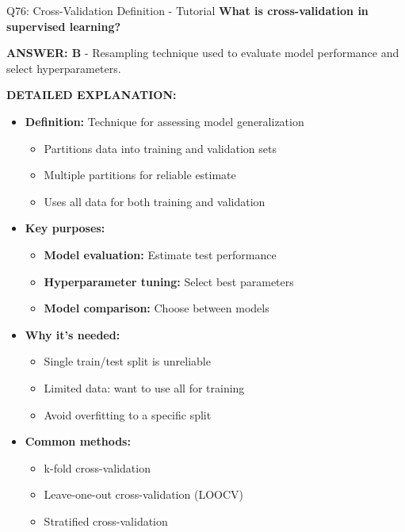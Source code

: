 \documentclass[8pt]{beamer}
\begin{document}
	
	\begin{frame}{Q76: Cross-Validation Definition - Tutorial}
		\fontsize{6.5}{7.5}\selectfont
		\textbf{What is cross-validation in supervised learning?}
		
		\vspace{0.05cm}
		\textcolor{myblue}{\textbf{ANSWER: B}} - Resampling technique used to evaluate model performance and select hyperparameters.
		
		\vspace{0.05cm}
		\textbf{DETAILED EXPLANATION:}
		\begin{itemize}
			\item \textbf{Definition:} Technique for assessing model generalization
			\begin{itemize}
				\item Partitions data into training and validation sets
				\item Multiple partitions for reliable estimate
				\item Uses all data for both training and validation
			\end{itemize}
			\item \textbf{Key purposes:}
			\begin{itemize}
				\item \textbf{Model evaluation:} Estimate test performance
				\item \textbf{Hyperparameter tuning:} Select best parameters
				\item \textbf{Model comparison:} Choose between models
			\end{itemize}
			\item \textbf{Why it's needed:}
			\begin{itemize}
				\item Single train/test split is unreliable
				\item Limited data: want to use all for training
				\item Avoid overfitting to a specific split
			\end{itemize}
			\item \textbf{Common methods:}
			\begin{itemize}
				\item k-fold cross-validation
				\item Leave-one-out cross-validation (LOOCV)
				\item Stratified cross-validation
			\end{itemize}
		\end{itemize}
		

\end{frame}
\end{document}
